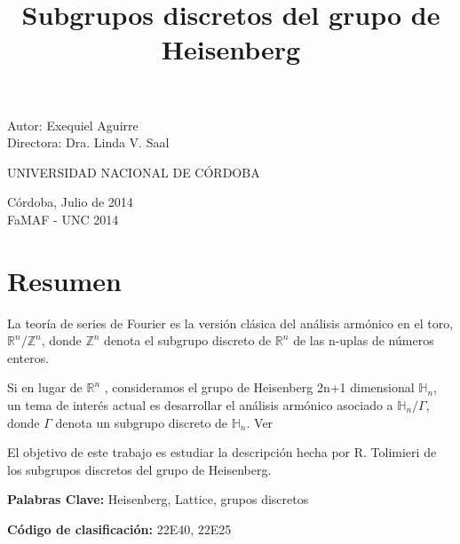 \documentclass[12pt]{article}
\author{}
\title{\Huge{Subgrupos discretos del grupo de Heisenberg} }
\date{}
\begin{document}
\maketitle
\vspace{100px}
\thispagestyle{empty}
\begin{center}
\begin{large}
Autor: Exequiel Aguirre \\ 
Directora: Dra. Linda V. Saal\\
\end{large}
\vspace{100px}

UNIVERSIDAD NACIONAL DE CÓRDOBA\\

\vspace{25px}


Córdoba, Julio de 2014\\
FaMAF - UNC 2014\\

\end{center}

\clearpage
\newpage\null\thispagestyle{empty}\newpage


\section*{Resumen}
La teoría de series de Fourier es la versión clásica del análisis armónico en el toro,
$\mathbb{R}^n /\mathbb{Z}^n$, donde $\mathbb{Z}^n$ denota el subgrupo discreto de $\mathbb{R}^n$ de
las n-uplas de números enteros.

Si en lugar de $\mathbb{R}^n$ , consideramos el grupo de Heisenberg 2n+1 dimensional $\mathbb{H}_n$, un tema
de interés actual es desarrollar el análisis armónico asociado a $\mathbb{H}_n/\Gamma$, donde $\Gamma$ 
denota un subgrupo discreto de $\mathbb{H}_n$. Ver \cite{Th} 

El objetivo de este trabajo es estudiar la descripción hecha por R. Tolimieri \cite{To} de los subgrupos discretos
del grupo de Heisenberg.

\bigskip\bigskip\bigskip
\textbf{Palabras Clave:} Heisenberg, Lattice, grupos discretos

\bigskip
\textbf{Código de clasificación:} 22E40, 22E25



\clearpage
\tableofcontents
\clearpage
\end{document}
